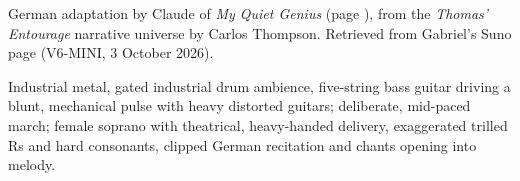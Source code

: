 
\begin{notes}
German adaptation by Claude of \emph{My Quiet Genius} (page \pageref{sec:my-quiet-genius}), from the \emph{Thomas’ Entourage} narrative universe by Carlos Thompson. Retrieved from Gabriel's Suno page (V6-MINI, 3 October 2026).
\end{notes}
\begin{style}
Industrial metal, gated industrial drum ambience, five-string bass guitar driving a blunt, mechanical pulse with heavy distorted guitars; deliberate, mid-paced march; female soprano with theatrical, heavy-handed delivery, exaggerated trilled Rs and hard consonants, clipped German recitation and chants opening into melody.
\end{style}
